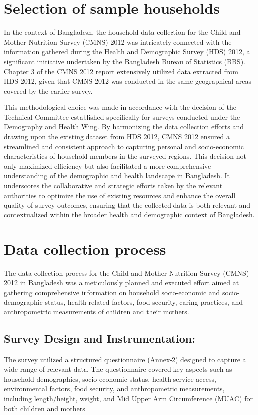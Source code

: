 \documentclass{report}
\begin{document}
\section{Selection of sample households}

In the context of Bangladesh, the household data collection for the Child and Mother Nutrition Survey (CMNS) 2012 was intricately connected with the information gathered during the Health and Demographic Survey (HDS) 2012, a significant initiative undertaken by the Bangladesh Bureau of Statistics (BBS). Chapter 3 of the CMNS 2012 report extensively utilized data extracted from HDS 2012, given that CMNS 2012 was conducted in the same geographical areas covered by the earlier survey.

This methodological choice was made in accordance with the decision of the Technical Committee established specifically for surveys conducted under the Demography and Health Wing. By harmonizing the data collection efforts and drawing upon the existing dataset from HDS 2012, CMNS 2012 ensured a streamlined and consistent approach to capturing personal and socio-economic characteristics of household members in the surveyed regions. This decision not only maximized efficiency but also facilitated a more comprehensive understanding of the demographic and health landscape in Bangladesh. It underscores the collaborative and strategic efforts taken by the relevant authorities to optimize the use of existing resources and enhance the overall quality of survey outcomes, ensuring that the collected data is both relevant and contextualized within the broader health and demographic context of Bangladesh.


\section{Data collection process}

The data collection process for the Child and Mother Nutrition Survey (CMNS) 2012 in Bangladesh was a meticulously planned and executed effort aimed at gathering comprehensive information on household socio-economic and socio-demographic status, health-related factors, food security, caring practices, and anthropometric measurements of children and their mothers.

\subsection{Survey Design and Instrumentation:}
The survey utilized a structured questionnaire (Annex-2) designed to capture a wide range of relevant data. The questionnaire covered key aspects such as household demographics, socio-economic status, health service access, environmental factors, food security, and anthropometric measurements, including length/height, weight, and Mid Upper Arm Circumference (MUAC) for both children and mothers.
\end{document}
